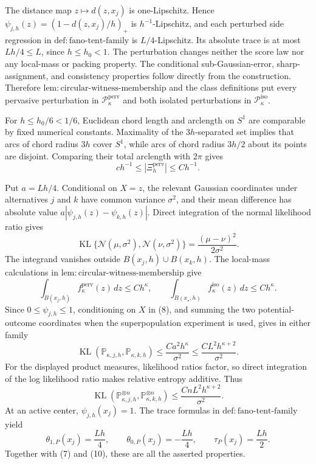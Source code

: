 The distance map \(z\mapsto d(z,x_j)\) is one-Lipschitz.  Hence
\(\psi_{j,h}(z)=(1-d(z,x_j)/h)_+\) is \(h^{-1}\)-Lipschitz, and each
perturbed side regression in \(\mathrm{def:fano\text{-}tent\text{-}family}\)
is \(L/4\)-Lipschitz.  Its absolute trace is at most \(Lh/4\le L\), since
\(h\le h_0<1\).  The perturbation changes neither the score law nor any
local-mass or packing property.  The conditional sub-Gaussian-error,
sharp-assignment, and consistency properties follow directly from the
construction.  Therefore
\(\mathrm{lem:circular\text{-}witness\text{-}membership}\) and the class
definitions put every pervasive perturbation in
\(\mathcal P_{\kappa}^{\mathrm{perv}}\) and both isolated perturbations in
\(\mathcal P_{\kappa}^{\mathrm{iso}}\).

For \(h\le h_0/6<1/6\), Euclidean chord length and arclength on \(S^1\)
are comparable by fixed numerical constants.  Maximality of the
\(3h\)-separated set implies that arcs of chord radius \(3h\) cover
\(S^1\), while arcs of chord radius \(3h/2\) about its points are
disjoint.  Comparing their total arclength with \(2\pi\) gives
\[
 c h^{-1}\le |\Xi_h^{\mathrm{perv}}|\le C h^{-1}. \tag{7}
\]

Put \(a=Lh/4\).  Conditional on \(X=z\), the relevant Gaussian
coordinates under alternatives \(j\) and \(k\) have common variance
\(\sigma^2\), and their mean difference has absolute value
\(a|\psi_{j,h}(z)-\psi_{k,h}(z)|\).  Direct integration of the normal
likelihood ratio gives
\[
 \operatorname{KL}\{\mathcal N(\mu,\sigma^2),\mathcal N(\nu,\sigma^2)\}
 =\frac{(\mu-\nu)^2}{2\sigma^2}. \tag{8}
\]
The integrand vanishes outside \(B(x_j,h)\cup B(x_k,h)\).  The local-mass
calculations in
\(\mathrm{lem:circular\text{-}witness\text{-}membership}\) give
\[
 \int_{B(x_j,h)}f_{\kappa}^{\mathrm{perv}}(z)\,dz\le Ch^{\kappa},
 \qquad
 \int_{B(x_{\star},h)}f_{\kappa}^{\mathrm{iso}}(z)\,dz\le Ch^{\kappa}.
\]
Since \(0\le\psi_{j,h}\le1\), conditioning on \(X\) in (8), and summing
the two potential-outcome coordinates when the superpopulation
experiment is used, gives in either family
\[
 \operatorname{KL}(\mathbb P_{\kappa,j,h},\mathbb P_{\kappa,k,h})
 \le \frac{Ca^2h^{\kappa}}{\sigma^2}
 \le \frac{CL^2h^{\kappa+2}}{\sigma^2}. \tag{9}
\]
For the displayed product measures, likelihood ratios factor, so direct
integration of the log likelihood ratio makes relative entropy additive.
Thus
\[
 \operatorname{KL}(\mathbb P_{\kappa,j,h}^{\otimes n},
 \mathbb P_{\kappa,k,h}^{\otimes n})
 \le \frac{CnL^2h^{\kappa+2}}{\sigma^2}. \tag{10}
\]
At an active center, \(\psi_{j,h}(x_j)=1\).  The trace formulas in
\(\mathrm{def:fano\text{-}tent\text{-}family}\) yield
\[
 \theta_{1,P}(x_j)=\frac{Lh}{4},\qquad
 \theta_{0,P}(x_j)=-\frac{Lh}{4},\qquad
 \tau_P(x_j)=\frac{Lh}{2}.
\]
Together with (7) and (10), these are all the asserted properties.

